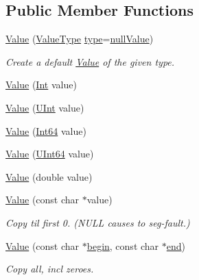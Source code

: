 \subsection*{Public Member Functions}
\begin{DoxyCompactItemize}
\item 
\hyperlink{class_json_1_1_value_ada6ba1369448fb0240bccc36efaa46f7}{Value} (\hyperlink{namespace_json_a7d654b75c16a57007925868e38212b4e}{Value\+Type} \hyperlink{class_json_1_1_value_a8ce61157a011894f0252ceed232312de}{type}=\hyperlink{namespace_json_a7d654b75c16a57007925868e38212b4ea7d9899633b4409bd3fc107e6737f8391}{null\+Value})
\begin{DoxyCompactList}\small\item\em Create a default \hyperlink{class_json_1_1_value}{Value} of the given type. \end{DoxyCompactList}\item 
\hyperlink{class_json_1_1_value_a4744ae571fcf34f4b16a2257b3b3b585}{Value} (\hyperlink{class_json_1_1_value_abdf7a7ff73eb130ffcab28504ffdb405}{Int} value)
\item 
\hyperlink{class_json_1_1_value_ae67a857b01286e3499a87e95be848d20}{Value} (\hyperlink{class_json_1_1_value_a0933d59b45793ae4aade1757c322a98d}{U\+Int} value)
\item 
\hyperlink{class_json_1_1_value_ab1cdc3d9a4d4cc03fa01439d43ceb1b5}{Value} (\hyperlink{class_json_1_1_value_a1b86af9f85f0f1baa972c3319fa22695}{Int64} value)
\item 
\hyperlink{class_json_1_1_value_a8adda58d5ae17bf7ca6a53bab4a7b69c}{Value} (\hyperlink{class_json_1_1_value_a8b62564be8c087c6d18de180ff4e13e3}{U\+Int64} value)
\item 
\hyperlink{class_json_1_1_value_a32228cc84d83200cca8441451997996c}{Value} (double value)
\item 
\hyperlink{class_json_1_1_value_ad87b849356816aca75995dd07302e49d}{Value} (const char $\ast$value)
\begin{DoxyCompactList}\small\item\em Copy til first 0. (N\+U\+LL causes to seg-\/fault.) \end{DoxyCompactList}\item 
\hyperlink{class_json_1_1_value_a39fa09d1902efbd4350e1236db920571}{Value} (const char $\ast$\hyperlink{class_json_1_1_value_a015459a3950c198d63a2d3be8f5ae296}{begin}, const char $\ast$\hyperlink{class_json_1_1_value_a3e443cd0ef24f7e028b175e47ee045e0}{end})
\begin{DoxyCompactList}\small\item\em Copy all, incl zeroes. \end{DoxyCompactList}\item 

\end{DoxyCompactItemize}
